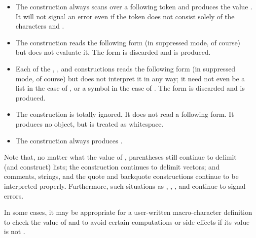 \begin{defun}[Variable]
\begin{itemize}
\item
The \cd{\#*} construction always scans over a following token and
produces the value {\nil}.
It will not signal an error even if the token does not consist solely
of the characters  and .
\end{itemize}

\begin{itemize}
\item
The  construction reads the following
form (in suppressed mode, of course) but does not evaluate it.
The form is discarded and {\nil} is produced.
\end{itemize}


\begin{itemize}
\item
Each of the , , and \cd{\#:}
constructions reads the following
form (in suppressed mode, of course) but does not interpret it in any way;
it need not even be a list in the case of , or a symbol
in the case of \cd{\#:}.  The form is discarded and {\nil} is produced.

\item
The \cd{\#=} construction is totally ignored.  It does not read
a following form.  It produces no object, but is treated as whitespace.

\item
The \cd{\#\#} construction always produces {\nil}.
\end{itemize}
Note that, no matter what the value of ,
parentheses still continue to delimit (and construct) lists;
the \cd{\#(} construction continues to delimit vectors;
and comments, strings, and the quote and backquote constructions continue to be
interpreted properly.  Furthermore, such situations as
,
\cd{\#<}, \cd{\#)}, and  continue to signal errors.

In some cases, it may be appropriate for a user-written macro-character
definition to check the value of  and to avoid certain
computations or side effects if its value is not {\nil}.
\end{defun}

